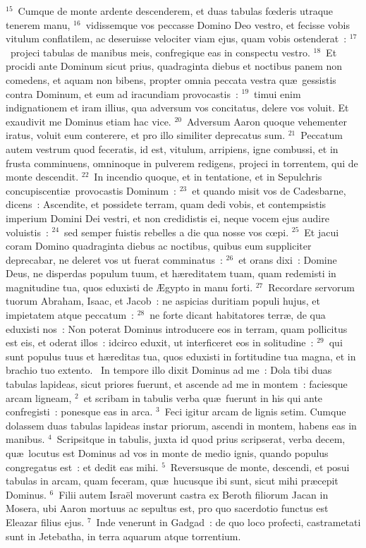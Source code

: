 ${}^{15}$~Cumque de monte ardente descenderem, et duas tabulas fœderis utraque tenerem manu,
${}^{16}$~vidissemque vos peccasse Domino Deo vestro, et fecisse vobis vitulum conflatilem, ac deseruisse velociter viam ejus, quam vobis ostenderat~:
${}^{17}$~projeci tabulas de manibus meis, confregique eas in conspectu vestro.
${}^{18}$~Et procidi ante Dominum sicut prius, quadraginta diebus et noctibus panem non comedens, et aquam non bibens, propter omnia peccata vestra qu\ae\ gessistis contra Dominum, et eum ad iracundiam provocastis~:
${}^{19}$~timui enim indignationem et iram illius, qua adversum vos concitatus, delere vos voluit. Et exaudivit me Dominus etiam hac vice.
${}^{20}$~Adversum Aaron quoque vehementer iratus, voluit eum conterere, et pro illo similiter deprecatus sum.
${}^{21}$~Peccatum autem vestrum quod feceratis, id est, vitulum, arripiens, igne combussi, et in frusta comminuens, omninoque in pulverem redigens, projeci in torrentem, qui de monte descendit.
${}^{22}$~In incendio quoque, et in tentatione, et in Sepulchris concupiscenti\ae\ provocastis Dominum~:
${}^{23}$~et quando misit vos de Cadesbarne, dicens~: Ascendite, et possidete terram, quam dedi vobis, et contempsistis imperium Domini Dei vestri, et non credidistis ei, neque vocem ejus audire voluistis~:
${}^{24}$~sed semper fuistis rebelles a die qua nosse vos cœpi.
${}^{25}$~Et jacui coram Domino quadraginta diebus ac noctibus, quibus eum suppliciter deprecabar, ne deleret vos ut fuerat comminatus~:
${}^{26}$~et orans dixi~: Domine Deus, ne disperdas populum tuum, et h\ae reditatem tuam, quam redemisti in magnitudine tua, quos eduxisti de \AE gypto in manu forti.
${}^{27}$~Recordare servorum tuorum Abraham, Isaac, et Jacob~: ne aspicias duritiam populi hujus, et impietatem atque peccatum~:
${}^{28}$~ne forte dicant habitatores terr\ae , de qua eduxisti nos~: Non poterat Dominus introducere eos in terram, quam pollicitus est eis, et oderat illos~: idcirco eduxit, ut interficeret eos in solitudine~:
${}^{29}$~qui sunt populus tuus et h\ae reditas tua, quos eduxisti in fortitudine tua magna, et in brachio tuo extento.
~\lettrine[lines=10,image=true,loversize=0.05,lraise=-0.03]{I}{}n tempore illo dixit Dominus ad me~: Dola tibi duas tabulas lapideas, sicut priores fuerunt, et ascende ad me in montem~: faciesque arcam ligneam,
${}^{2}$~et scribam in tabulis verba qu\ae\ fuerunt in his qui ante confregisti~: ponesque eas in arca.
${}^{3}$~Feci igitur arcam de lignis setim. Cumque dolassem duas tabulas lapideas instar priorum, ascendi in montem, habens eas in manibus.
${}^{4}$~Scripsitque in tabulis, juxta id quod prius scripserat, verba decem, qu\ae\ locutus est Dominus ad vos in monte de medio ignis, quando populus congregatus est~: et dedit eas mihi.
${}^{5}$~Reversusque de monte, descendi, et posui tabulas in arcam, quam feceram, qu\ae\ hucusque ibi sunt, sicut mihi pr\ae cepit Dominus.
${}^{6}$~Filii autem Isra\"el moverunt castra ex Beroth filiorum Jacan in Mosera, ubi Aaron mortuus ac sepultus est, pro quo sacerdotio functus est Eleazar filius ejus.
${}^{7}$~Inde venerunt in Gadgad~: de quo loco profecti, castrametati sunt in Jetebatha, in terra aquarum atque torrentium.


